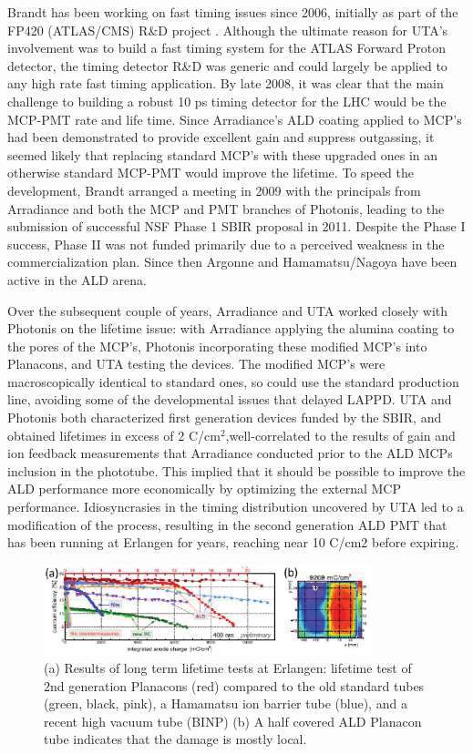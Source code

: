 Brandt has been working on fast timing issues since 2006, initially as part of the FP420 (ATLAS/CMS) R\&D project \cite{FP420}. Although the ultimate reason for UTA’s involvement was to build a fast timing system for the ATLAS Forward Proton detector, the timing detector R\&D was generic and could largely be applied to any high rate fast timing application. By late 2008, it was clear that the main challenge to building a robust 10 ps timing detector for the LHC would be the MCP-PMT rate and life time. Since Arradiance’s ALD coating applied to MCP’s had been demonstrated to provide excellent gain and  suppress outgassing, it seemed likely that replacing standard MCP’s with these upgraded ones in an otherwise standard MCP-PMT would improve the lifetime. To speed the development,  Brandt arranged a meeting in 2009 with the principals from Arradiance and both the MCP and PMT branches of Photonis, leading  to the submission of  successful NSF Phase 1 SBIR proposal in 2011. Despite the Phase I success, Phase II was not funded primarily due to a perceived weakness in the commercialization plan.  Since then Argonne and Hamamatsu/Nagoya have been active in the ALD arena.

Over the subsequent couple of years, Arradiance and UTA worked closely with Photonis on the lifetime issue: with Arradiance applying the alumina coating to the pores of the MCP’s, Photonis incorporating these modified MCP’s into Planacons, and UTA testing the devices. The modified MCP’s were macroscopically identical to standard ones, so could use the standard production line, avoiding some of the developmental issues that delayed LAPPD. UTA and Photonis both characterized first generation devices funded by the SBIR, and obtained lifetimes in excess of 2 C/cm$^{2}$,well-correlated to the results of gain and ion feedback measurements that Arradiance conducted prior to the ALD MCPs inclusion in the phototube. This implied that it should be possible to improve the ALD performance more economically by optimizing the external MCP performance. Idiosyncrasies in the timing distribution uncovered by UTA led to a modification of the process, resulting in the second generation ALD PMT that has been running at Erlangen for years, reaching near 10 C/cm2 before expiring.  

\begin{figure}[htb]
\centering
\includegraphics[width=0.85\textwidth]{images/figure2Brandt.eps}
\caption[]{(a)  Results of long term lifetime tests at Erlangen: lifetime test of 2nd generation Planacons (red) compared to the old  standard tubes (green, black, pink), a Hamamatsu ion barrier tube (blue), and a recent high vacuum tube (BINP)  (b) A half covered ALD Planacon tube indicates that the damage is mostly local.}
\label{fig:Erlangen}
\end{figure}

